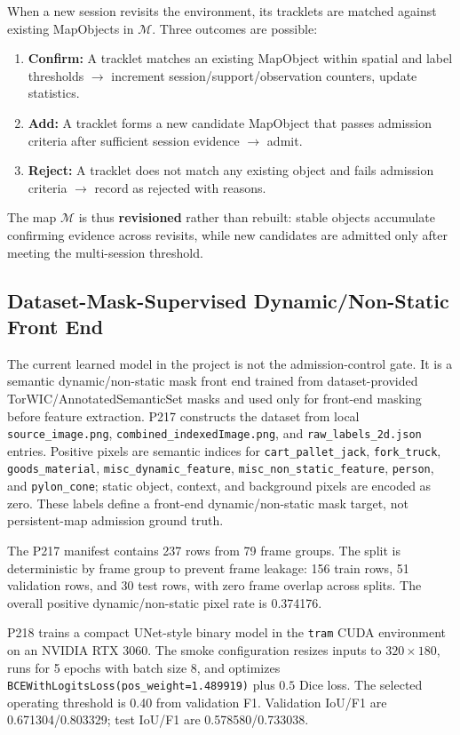 \documentclass[journal]{IEEEtran}
\begin{document}
When a new session revisits the environment, its tracklets are matched against existing MapObjects in $\mathcal{M}$. Three outcomes are possible:
\begin{enumerate}
  \item \textbf{Confirm:} A tracklet matches an existing MapObject within spatial and label thresholds $\rightarrow$ increment session/support/observation counters, update statistics.
  \item \textbf{Add:} A tracklet forms a new candidate MapObject that passes admission criteria after sufficient session evidence $\rightarrow$ admit.
  \item \textbf{Reject:} A tracklet does not match any existing object and fails admission criteria $\rightarrow$ record as rejected with reasons.
\end{enumerate}
The map $\mathcal{M}$ is thus \textbf{revisioned} rather than rebuilt: stable objects accumulate confirming evidence across revisits, while new candidates are admitted only after meeting the multi-session threshold.

\subsection{Dataset-Mask-Supervised Dynamic/Non-Static Front End}
\label{sec:dynamic_mask_frontend}

The current learned model in the project is not the admission-control gate. It is a semantic dynamic/non-static mask front end trained from dataset-provided TorWIC/AnnotatedSemanticSet masks and used only for front-end masking before feature extraction. P217 constructs the dataset from local \texttt{source\_image.png}, \texttt{combined\_indexedImage.png}, and \texttt{raw\_labels\_2d.json} entries. Positive pixels are semantic indices for \texttt{cart\_pallet\_jack}, \texttt{fork\_truck}, \texttt{goods\_material}, \texttt{misc\_dynamic\_feature}, \texttt{misc\_non\_static\_feature}, \texttt{person}, and \texttt{pylon\_cone}; static object, context, and background pixels are encoded as zero. These labels define a front-end dynamic/non-static mask target, not persistent-map admission ground truth.

The P217 manifest contains 237 rows from 79 frame groups. The split is deterministic by frame group to prevent frame leakage: 156 train rows, 51 validation rows, and 30 test rows, with zero frame overlap across splits. The overall positive dynamic/non-static pixel rate is 0.374176.

P218 trains a compact UNet-style binary model in the \texttt{tram} CUDA environment on an NVIDIA RTX 3060. The smoke configuration resizes inputs to $320{\times}180$, runs for 5 epochs with batch size 8, and optimizes \texttt{BCEWithLogitsLoss(pos\_weight=1.489919)} plus $0.5$ Dice loss. The selected operating threshold is 0.40 from validation F1. Validation IoU/F1 are 0.671304/0.803329; test IoU/F1 are 0.578580/0.733038.
\end{document}
